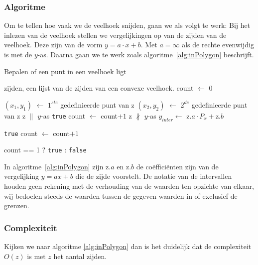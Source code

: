 \subsubsection{Algoritme}
Om te tellen hoe vaak we de veelhoek snijden, gaan we als volgt te werk:
Bij het inlezen van de veelhoek stellen we vergelijkingen op van de zijden van de 
veelhoek. Deze zijn van de vorm $y=a \cdot x+b$. Met $a = \infty$ als de rechte evenwijdig is met de $y$-as. Daarna gaan we te werk zoals algoritme~\ref{alg:inPolygon} beschrijft.



	\begin{algorithm}
	 	\caption{Bepalen of een punt in een veelhoek ligt}
		\begin{algorithmic}
		\Require zijden, een lijst van de zijden van een convexe veelhoek.
		\State count $\gets$ 0
		
		\State $(x_1,y_1)$ $\gets$ $1^{ste}$ gedefinieerde punt van z
		\State $(x_2,y_2)$ $\gets$ $2^{de}$ gedefinieerde punt van z
		 	\Comment z $\parallel$ $y$-as 
			\State \Return \texttt{true} 
				\State count $\gets$ count$+1$
			\EndIf
		\Else	\Comment z $\not \parallel$ $y$-as
			\State $y_{inter}  \gets$ z.$a\cdot P_x +$z.$b$
			
				\State \Return \texttt{true} 
				\State count $\gets$ count$+1$
			\EndIf
				
			\EndIf
		\EndIf	

		\EndFor		

		\Return count == 1 ? \texttt{true} : \texttt{false}
		\EndFunction
		\end{algorithmic}
		\label{alg:inPolygon}
	\end{algorithm}		

In algoritme~\ref{alg:inPolygon} zijn z$.a$ en z$.b$ de coëfficiënten zijn van de vergelijking $y=ax+b$ die de zijde 
voorstelt. De notatie van de intervallen houden geen rekening met de verhouding van de waarden ten opzichte van elkaar, wij bedoelen steeds de waarden tussen de gegeven waarden in of exclusief de grenzen.

\subsubsection{Complexiteit}
Kijken we naar algoritme \ref{alg:inPolygon} dan is het duidelijk dat de complexiteit $O(z)$ is met $z$ het aantal zijden.


